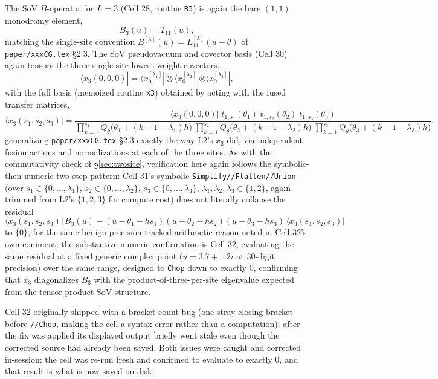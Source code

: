\documentclass[11pt]{article}
\newcommand{\qth}{Q_\theta}
\begin{document}
The SoV $B$-operator for $L=3$ (Cell 28, routine \texttt{B3}) is again the bare $(1,1)$ monodromy
element,
\[
  B_3(u) = T_{11}(u),
\]
matching the single-site convention $B^{[\lambda]}(u)=L^{[\lambda]}_{11}(u-\theta)$ of
\texttt{paper/xxxCG.tex} \S2.3. The SoV pseudovacuum and covector basis (Cell 30) again tensors the
three single-site lowest-weight covectors,
\[
  \langle x_3(0,0,0)| = \langle x^{[\lambda_1]}_0|\otimes\langle x^{[\lambda_2]}_0|\otimes\langle x^{[\lambda_3]}_0|,
\]
with the full basis (memoized routine \texttt{x3}) obtained by acting with the fused transfer
matrices,
\begin{equation}
  \langle x_3(s_1,s_2,s_3)| =
  \frac{\langle x_3(0,0,0)|\;t_{1,s_1}(\theta_1)\;t_{1,s_2}(\theta_2)\;t_{1,s_3}(\theta_3)}
       {\displaystyle\prod_{k=1}^{s_1}\qth\bigl(\theta_1+(k-1-\lambda_1)h\bigr)\;
        \prod_{k=1}^{s_2}\qth\bigl(\theta_2+(k-1-\lambda_2)h\bigr)\;
        \prod_{k=1}^{s_3}\qth\bigl(\theta_3+(k-1-\lambda_3)h\bigr)},
  \label{eq:x3}
\end{equation}
generalizing \texttt{paper/xxxCG.tex} \S2.3 exactly the way L2's $x_2$ did, via independent fusion
actions and normalizations at each of the three sites. As with the commutativity check of
\S\ref{sec:twosite}, verification here again follows the symbolic-then-numeric two-step pattern:
Cell 31's symbolic \texttt{Simplify//Flatten//Union} (over $s_1\in\{0,\dots,\lambda_1\}$,
$s_2\in\{0,\dots,\lambda_2\}$, $s_3\in\{0,\dots,\lambda_3\}$, $\lambda_1,\lambda_2,\lambda_3\in\{1,2\}$,
again trimmed from L2's $\{1,2,3\}$ for compute cost) does not literally collapse the residual
\[
  \langle x_3(s_1,s_2,s_3)|\, B_3(u) - (u-\theta_1-hs_1)(u-\theta_2-hs_2)(u-\theta_3-hs_3)\,\langle x_3(s_1,s_2,s_3)|
\]
to $\{0\}$, for the same benign precision-tracked-arithmetic reason noted in Cell 32's own comment;
the substantive numeric confirmation is Cell 32, evaluating the same residual at a fixed generic
complex point ($u=3.7+1.2i$ at 30-digit precision) over the same range, designed to \texttt{Chop} down
to exactly $0$, confirming that $x_3$ diagonalizes $B_3$ with the product-of-three-per-site
eigenvalue expected from the tensor-product SoV structure.

Cell 32 originally shipped with a bracket-count bug (one stray closing bracket before
\texttt{//Chop}, making the cell a syntax error rather than a computation); after the fix was
applied its displayed output briefly went stale even though the corrected source had already been
saved. Both issues were caught and corrected in-session: the cell was re-run fresh and confirmed to
evaluate to exactly $0$, and that result is what is now saved on disk.
\end{document}

